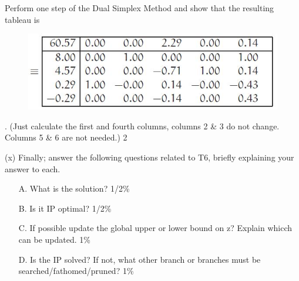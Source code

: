\documentclass{beamer}
\begin{document}
\begin{frame}
Perform one step of the Dual Simplex Method and show that the
resulting tableau is \begin{figure}
\centering
\includegraphics[width=0.7\linewidth]{Exam14-i}
\caption{}
\label{fig:Exam14-i}
\end{figure}

.
(Just calculate the first and fourth columns, columns 2 \& 3 do
not change. Columns 5 \& 6 are not needed.) 2%
\end{frame}
\begin{frame}
(x) Finally; answer the following questions related to T6, briefly explaining your answer to each.
\begin{itemize}
\item[A.] What is the solution? 1/2\%
\item[B.] Is it IP optimal? 1/2\%
\item[C.] If possible update the global upper or lower bound on z? Explain
whicch can be updated. 1\%
\item[D.] Is the IP solved? If not, what other branch or branches must
be searched/fathomed/pruned? 1\%
\end{itemize}

\end{frame}

\end{document}
